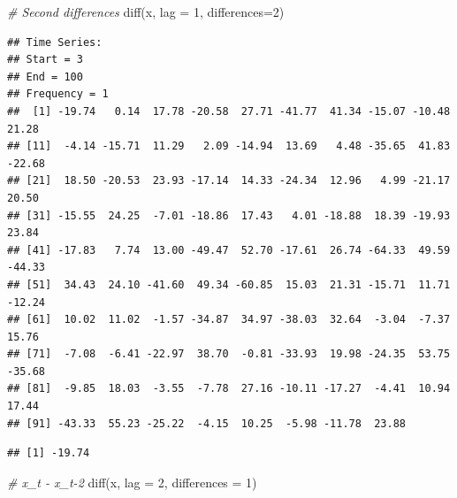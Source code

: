 \documentclass[
]{book}
\newenvironment{Shaded}{\begin{snugshade}}{\end{snugshade}}
\newcommand{\AttributeTok}[1]{\textcolor[rgb]{0.77,0.63,0.00}{#1}}
\newcommand{\CommentTok}[1]{\textcolor[rgb]{0.56,0.35,0.01}{\textit{#1}}}
\newcommand{\DecValTok}[1]{\textcolor[rgb]{0.00,0.00,0.81}{#1}}
\newcommand{\FunctionTok}[1]{\textcolor[rgb]{0.00,0.00,0.00}{#1}}
\newcommand{\NormalTok}[1]{#1}
\newcommand{\SpecialCharTok}[1]{\textcolor[rgb]{0.00,0.00,0.00}{#1}}
\theoremstyle{definition}
\theoremstyle{definition}
\theoremstyle{definition}
\theoremstyle{definition}
\theoremstyle{remark}
\begin{document}
\begin{Shaded}
\begin{Highlighting}[]
\CommentTok{\# Second differences}
\FunctionTok{diff}\NormalTok{(x, }\AttributeTok{lag =} \DecValTok{1}\NormalTok{, }\AttributeTok{differences=}\DecValTok{2}\NormalTok{)}
\end{Highlighting}
\end{Shaded}

\begin{verbatim}
## Time Series:
## Start = 3 
## End = 100 
## Frequency = 1 
##  [1] -19.74   0.14  17.78 -20.58  27.71 -41.77  41.34 -15.07 -10.48  21.28
## [11]  -4.14 -15.71  11.29   2.09 -14.94  13.69   4.48 -35.65  41.83 -22.68
## [21]  18.50 -20.53  23.93 -17.14  14.33 -24.34  12.96   4.99 -21.17  20.50
## [31] -15.55  24.25  -7.01 -18.86  17.43   4.01 -18.88  18.39 -19.93  23.84
## [41] -17.83   7.74  13.00 -49.47  52.70 -17.61  26.74 -64.33  49.59 -44.33
## [51]  34.43  24.10 -41.60  49.34 -60.85  15.03  21.31 -15.71  11.71 -12.24
## [61]  10.02  11.02  -1.57 -34.87  34.97 -38.03  32.64  -3.04  -7.37  15.76
## [71]  -7.08  -6.41 -22.97  38.70  -0.81 -33.93  19.98 -24.35  53.75 -35.68
## [81]  -9.85  18.03  -3.55  -7.78  27.16 -10.11 -17.27  -4.41  10.94  17.44
## [91] -43.33  55.23 -25.22  -4.15  10.25  -5.98 -11.78  23.88
\end{verbatim}

\begin{Shaded}
\end{Shaded}

\begin{verbatim}
## [1] -19.74
\end{verbatim}

\begin{Shaded}
\begin{Highlighting}[]
\CommentTok{\# x\_t {-} x\_t{-}2}
\FunctionTok{diff}\NormalTok{(x, }\AttributeTok{lag =} \DecValTok{2}\NormalTok{, }\AttributeTok{differences =} \DecValTok{1}\NormalTok{)}
\end{Highlighting}
\end{Shaded}
\end{document}
